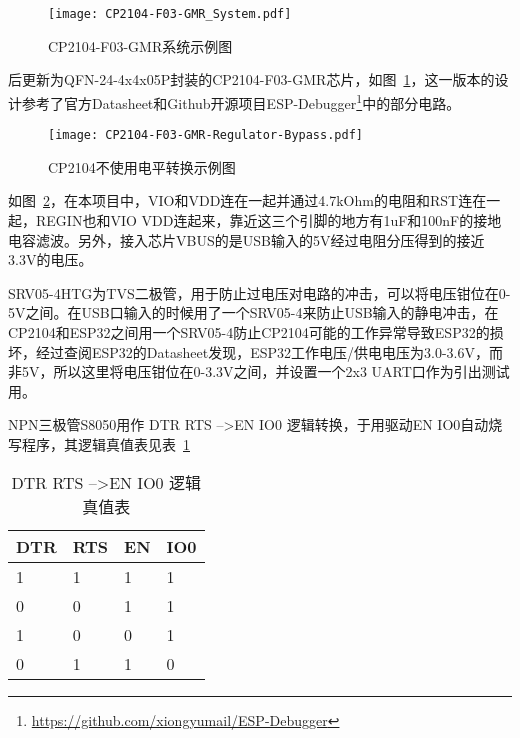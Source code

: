 \begin{figure}[htbp]
    \centering
    \texttt{[image: CP2104-F03-GMR\_System.pdf]}
    \caption{CP2104-F03-GMR系统示例图}
    \label{fig:CP2104-F03-GMR}
\end{figure}

后更新为QFN-24-4x4x05P封装的CP2104-F03-GMR芯片，如图~\ref{fig:CP2104-F03-GMR}，这一版本的设计参考了官方Datasheet和Github开源项目ESP-Debugger\footnote{\url{https://github.com/xiongyumail/ESP-Debugger}}中的部分电路。

\begin{figure}[htbp]
    \centering
    \texttt{[image: CP2104-F03-GMR-Regulator-Bypass.pdf]}
    \caption{CP2104不使用电平转换示例图}
    \label{fig:CP2104-Regulator-Bypass}
\end{figure}

如图~\ref{fig:CP2104-Regulator-Bypass}，在本项目中，VIO和VDD连在一起并通过4.7kOhm的电阻和RST连在一起，REGIN也和VIO VDD连起来，靠近这三个引脚的地方有1uF和100nF的接地电容滤波。另外，接入芯片VBUS的是USB输入的5V经过电阻分压得到的接近3.3V的电压。

SRV05-4HTG为TVS二极管，用于防止过电压对电路的冲击，可以将电压钳位在0-5V之间。在USB口输入的时候用了一个SRV05-4来防止USB输入的静电冲击，在CP2104和ESP32之间用一个SRV05-4防止CP2104可能的工作异常导致ESP32的损坏，经过查阅ESP32的Datasheet发现，ESP32工作电压/供电电压为3.0-3.6V，而非5V，所以这里将电压钳位在0-3.3V之间，并设置一个2x3 UART口作为引出测试用。

NPN三极管S8050用作 DTR RTS --\textgreater EN IO0 逻辑转换，于用驱动EN IO0自动烧写程序，其逻辑真值表见表~\ref{tab:LogicTab}

\begin{table}[]
    \centering
    \begin{tabular}{@{}llll@{}}
    \toprule
    DTR & RTS & EN & IO0 \\ \midrule
    1   & 1   & 1  & 1   \\
    0   & 0   & 1  & 1   \\
    1   & 0   & 0  & 1   \\
    0   & 1   & 1  & 0   \\ \bottomrule
    \end{tabular}
    \caption{DTR RTS --\textgreater EN IO0 逻辑真值表}
    \label{tab:LogicTab}
\end{table}


